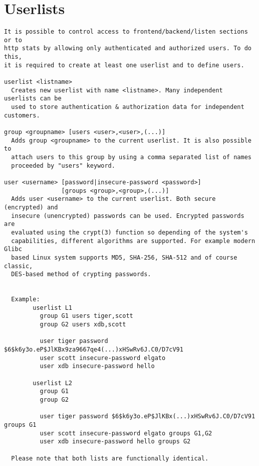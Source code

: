 
\section{Userlists}

\begin{verbatim}
It is possible to control access to frontend/backend/listen sections or to
http stats by allowing only authenticated and authorized users. To do this,
it is required to create at least one userlist and to define users.

userlist <listname>
  Creates new userlist with name <listname>. Many independent userlists can be
  used to store authentication & authorization data for independent customers.

group <groupname> [users <user>,<user>,(...)]
  Adds group <groupname> to the current userlist. It is also possible to
  attach users to this group by using a comma separated list of names
  proceeded by "users" keyword.

user <username> [password|insecure-password <password>]
                [groups <group>,<group>,(...)]
  Adds user <username> to the current userlist. Both secure (encrypted) and
  insecure (unencrypted) passwords can be used. Encrypted passwords are
  evaluated using the crypt(3) function so depending of the system's
  capabilities, different algorithms are supported. For example modern Glibc
  based Linux system supports MD5, SHA-256, SHA-512 and of course classic,
  DES-based method of crypting passwords.


  Example:
        userlist L1
          group G1 users tiger,scott
          group G2 users xdb,scott

          user tiger password $6$k6y3o.eP$JlKBx9za9667qe4(...)xHSwRv6J.C0/D7cV91
          user scott insecure-password elgato
          user xdb insecure-password hello

        userlist L2
          group G1
          group G2

          user tiger password $6$k6y3o.eP$JlKBx(...)xHSwRv6J.C0/D7cV91 groups G1
          user scott insecure-password elgato groups G1,G2
          user xdb insecure-password hello groups G2

  Please note that both lists are functionally identical.


\end{verbatim}
